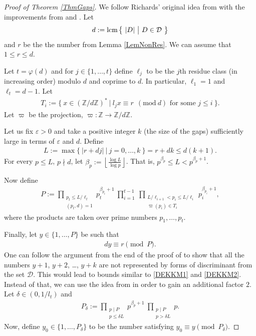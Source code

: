 \documentclass[a4paper]{amsart}
\newcommand{\Mod}[1]{\ (\mathrm{mod}\ #1)}
\newcommand{\1}{\mathbbm{1}}
\newcommand{\lcm}{{\rm lcm}\hspace{0.05cm}}
\begin{document}
\begin{proof}[Proof of Theorem \ref{ThmGaps}] We follow Richards' original idea from \cite{Richards} with the improvements from \cite{MS} and \cite{DEKKM}. Let
\begin{align*}
d:=\lcm\big\{\ |D|\ \big|\ D\in\mathcal{D}\ \big\}
\end{align*}
and $r$ be the the number from Lemma \ref{LemNonRes}. We can assume that $1\leq r\leq d$.

Let $t=\varphi (d)$ and for $j\in\{1,\ldots ,t\}$ define $\ell_{j}$ to be the $j$th residue class (in increasing order) modulo $d$ and coprime to $d$. In particular, $\ell_{1}=1$ and $\ell_{t}=d-1$. Let
\begin{align*}
T_{i}:=\big\{\ x\in (\mathbb{Z}/d\mathbb{Z})^{*}\ |\ l_{j}x\equiv r\ \Mod{d} \textrm{ for some } j\leq i \ \big\}.
\end{align*}
Let $\varpi$ be the projection, $\varpi :\mathbb{Z}\to\mathbb{Z}/d\mathbb{Z}$.

Let us fix $\varepsilon >0$ and take a positive integer $k$ (the size of the gaps) sufficiently large in terms of $\varepsilon$ and $d$. Define
\begin{align*}
L:=\max\big\{\ |r+dj| \ \big|\ j=0,\ldots ,k \ \big\}=r+dk\leq d(k+1).
\end{align*}
For every $p\leq L$, $p\nmid d$, let $\beta_{p}:=\left\lfloor\frac{\log L}{\log p}\right\rfloor$. That is, $p^{\beta_{p}}\leq L<p^{\beta_{p}+1}$. 

Now define
\begin{align*}
P:=\prod_{\substack{ p_{t}\leq L/\ell_{t} \\ (p_{t},d)=1 }}p_{t}^{\beta_{p_{t}}+1} \ \prod_{i=1}^{t-1} \ \prod_{\substack{ L/\ell_{i+1} < p_{i}\leq L/\ell_{i} \\ \varpi (p_{i})\in T_{i} }}p_{i}^{\beta_{p_{i}}+1} ,
\end{align*}
where the products are taken over prime numbers $p_{1},\ldots ,p_{t}$.

Finally, let $y\in\{1,\ldots ,P\}$ be such that 
\begin{align*}
dy\equiv r\pmod{P} .
\end{align*}
One can follow the argument from the end of the proof of \cite[Theorem 2]{DEKKM} to show that all the numbers $y+1$, $y+2$, \ldots , $y+k$ are not represented by forms of discriminant from the set $\mathcal{D}$. This would lead to bounds similar to \eqref{DEKKM1} and \eqref{DEKKM2}. Instead of that, we can use the idea from \cite{DEKKM,KK} in order to gain an additional factor $2$. Let $\delta\in (0,1/l_{t})$ and
\begin{align}\label{EqPdelta}
P_{\delta}:=\prod_{\substack{p\mid P \\ p\leq\delta L}}p^{\beta_{p}+1}\ \prod_{\substack{p\mid P \\ p>\delta L}}p.
\end{align}
Now, define $y_{0}\in\{1,\ldots ,P_{\delta}\}$ to be the number satisfying $y_{0}\equiv y\pmod{P_{\delta}}$.


\end{proof}
\end{document}
